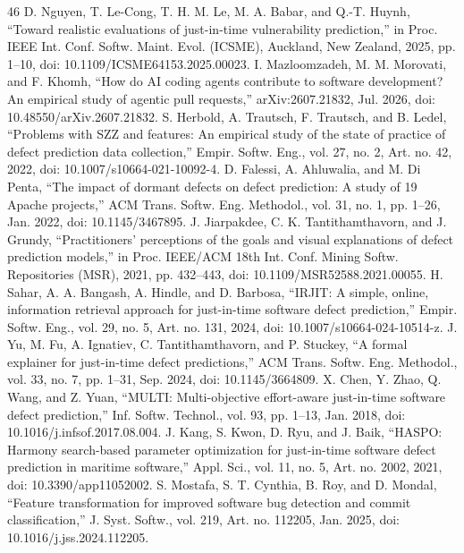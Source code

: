 \begin{thebibliography}{46}
 D. Nguyen, T. Le-Cong, T. H. M. Le, M. A. Babar, and Q.-T. Huynh, ``Toward realistic evaluations of just-in-time vulnerability prediction,'' in Proc. IEEE Int. Conf. Softw. Maint. Evol. (ICSME), Auckland, New Zealand, 2025, pp. 1--10, doi: \mbox{10.1109/ICSME64153.2025.00023}.
 I. Mazloomzadeh, M. M. Morovati, and F. Khomh, ``How do AI coding agents contribute to software development? An empirical study of agentic pull requests,'' arXiv:2607.21832, Jul. 2026, doi: \mbox{10.48550/arXiv.2607.21832}.
 S. Herbold, A. Trautsch, F. Trautsch, and B. Ledel, ``Problems with SZZ and features: An empirical study of the state of practice of defect prediction data collection,'' Empir. Softw. Eng., vol. 27, no. 2, Art. no. 42, 2022, doi: \mbox{10.1007/s10664-021-10092-4}.
 D. Falessi, A. Ahluwalia, and M. Di Penta, ``The impact of dormant defects on defect prediction: A study of 19 Apache projects,'' ACM Trans. Softw. Eng. Methodol., vol. 31, no. 1, pp. 1--26, Jan. 2022, doi: \mbox{10.1145/3467895}.
 J. Jiarpakdee, C. K. Tantithamthavorn, and J. Grundy, ``Practitioners' perceptions of the goals and visual explanations of defect prediction models,'' in Proc. IEEE/ACM 18th Int. Conf. Mining Softw. Repositories (MSR), 2021, pp. 432--443, doi: \mbox{10.1109/MSR52588.2021.00055}.
 H. Sahar, A. A. Bangash, A. Hindle, and D. Barbosa, ``IRJIT: A simple, online, information retrieval approach for just-in-time software defect prediction,'' Empir. Softw. Eng., vol. 29, no. 5, Art. no. 131, 2024, doi: \mbox{10.1007/s10664-024-10514-z}.
 J. Yu, M. Fu, A. Ignatiev, C. Tantithamthavorn, and P. Stuckey, ``A formal explainer for just-in-time defect predictions,'' ACM Trans. Softw. Eng. Methodol., vol. 33, no. 7, pp. 1--31, Sep. 2024, doi: \mbox{10.1145/3664809}.
 X. Chen, Y. Zhao, Q. Wang, and Z. Yuan, ``MULTI: Multi-objective effort-aware just-in-time software defect prediction,'' Inf. Softw. Technol., vol. 93, pp. 1--13, Jan. 2018, doi: \mbox{10.1016/j.infsof.2017.08.004}.
 J. Kang, S. Kwon, D. Ryu, and J. Baik, ``HASPO: Harmony search-based parameter optimization for just-in-time software defect prediction in maritime software,'' Appl. Sci., vol. 11, no. 5, Art. no. 2002, 2021, doi: \mbox{10.3390/app11052002}.
 S. Mostafa, S. T. Cynthia, B. Roy, and D. Mondal, ``Feature transformation for improved software bug detection and commit classification,'' J. Syst. Softw., vol. 219, Art. no. 112205, Jan. 2025, doi: \mbox{10.1016/j.jss.2024.112205}.

\end{thebibliography}
